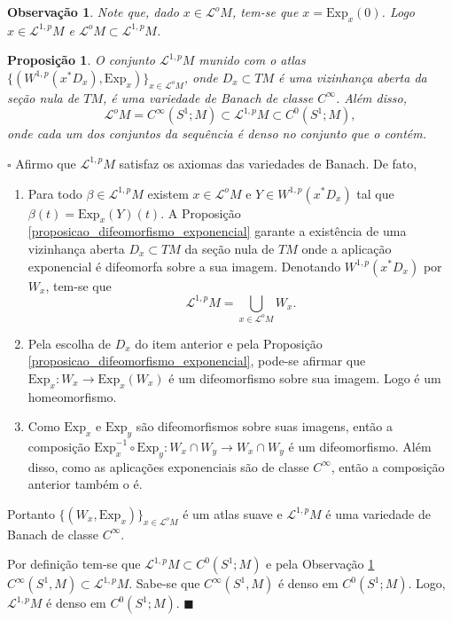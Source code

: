 \documentclass[12pt]{book}
\newtheorem{observacao}[teorema]{Observação}
\newtheorem{proposicao}[teorema]{Proposição}
\newenvironment{prova}[1]{$\square$ #1}{\hfill$\blacksquare$}
\newcommand{\aplicaoessuaves}[2]{C^{\infty}(#1, #2)}
\newcommand{\caminhosexponenciaisSobolev}{\mathcal{L}^{1,p}M}
\newcommand{\circulo}{S^{1}}
\newcommand{\espacosobolev}[1]{W^{1,p}(#1)}
\newcommand{\Exp}{\text{Exp}}
\newcommand{\lacocontrateis}{\mathcal{L}^{o}M}
\begin{document}
	\begin{observacao}\label{observacao_inclusao_lacoescontrateis}
		Note que, dado $x\in \lacocontrateis$, tem-se que $x=\Exp_{x}(0)$. Logo $x\in \caminhosexponenciaisSobolev$ e $\lacocontrateis \subset \caminhosexponenciaisSobolev$.
	\end{observacao}
	
	\begin{proposicao}\label{proposicao_caminhos_variedade_banach}
		O conjunto $\caminhosexponenciaisSobolev$ munido com o atlas $\{(\espacosobolev{x^{*}D_{x}}, \Exp_{x})\}_{x \in \lacocontrateis }$, onde $D_{x} \subset TM$ é uma vizinhança aberta da seção nula de $TM$, é uma variedade de Banach de classe $C^{\infty}$. Além disso, 
		$$
		\lacocontrateis = C^{\infty}(\circulo;M) \subset  \caminhosexponenciaisSobolev\subset C^{0}(\circulo;M),
		$$
		onde cada um dos conjuntos da sequência é denso no conjunto que o contém.
	\end{proposicao}
	\begin{prova}
		Afirmo que $\caminhosexponenciaisSobolev$ satisfaz os axiomas das variedades de Banach. De fato,
		\begin{enumerate}
			\item Para todo $\beta \in \caminhosexponenciaisSobolev $ existem $x \in \lacocontrateis$ e $Y \in \espacosobolev{x^{*}D_{x}}$ tal que $\beta(t)=\Exp_{x}(Y)(t)$. A Proposição \ref{proposicao_difeomorfismo_exponencial} garante a existência de uma vizinhança aberta $D_{x} \subset TM$ da seção nula de $TM$ onde a aplicação exponencial é difeomorfa sobre a sua imagem. Denotando $\espacosobolev{x^{*}D_{x}}$ por $W_{x}$, tem-se que
			$$
			\caminhosexponenciaisSobolev = \bigcup_{x \in \lacocontrateis} W_{x}.
			$$
			
			\item Pela escolha de $D_{x}$ do item anterior e pela Proposição \ref{proposicao_difeomorfismo_exponencial}, pode-se afirmar que $\Exp_{x}:W_{x} \to \Exp_{x}(W_{x})$ é um difeomorfismo sobre sua imagem. Logo é um homeomorfismo.
			
			\item Como $\Exp_{x}$ e $\Exp_{y}$ são difeomorfismos sobre suas imagens, então a composição $\Exp_{x}^{-1} \circ \Exp_{y} :W_{x} \cap W_{y} \to W_{x} \cap W_{y}$ é um difeomorfismo. Além disso, como as aplicações exponenciais são de classe $C^{\infty}$, então a composição anterior também o é.
		\end{enumerate}
		
		Portanto $\{(W_{x}, \Exp_{x}) \}_{x \in \lacocontrateis}$ é um atlas suave e $\caminhosexponenciaisSobolev$ é uma variedade de Banach de classe $C^{\infty}$. 
		
		Por definição tem-se que $\caminhosexponenciaisSobolev\subset C^{0}(\circulo;M)$ e pela Observação \ref{observacao_inclusao_lacoescontrateis} $\aplicaoessuaves{\circulo}{M} \subset \caminhosexponenciaisSobolev$. Sabe-se que $\aplicaoessuaves{\circulo}{M}$ é denso em $C^{0}(\circulo;M)$. Logo, $\caminhosexponenciaisSobolev$ é denso em $C^{0}(\circulo;M)$.
	\end{prova}
	
\end{document}
